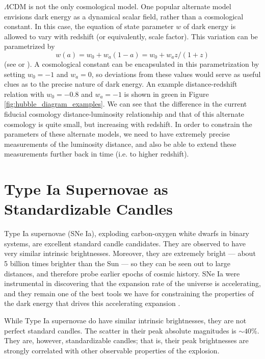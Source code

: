 $\Lambda$CDM is not the only cosmological model. One popular alternate model envisions dark energy as a dynamical scalar field, rather than a cosmological constant. In this case, the equation of state parameter $w$ of dark energy is allowed to vary with redshift (or equivalently, scale factor). This variation can be parametrized by
\begin{equation}
    w(a) = w_0 + w_a(1 - a) = w_0 + w_a z/(1+z)
\end{equation}
(see \citet{chevallier_accelerating_2001} or \citet{linder_exploring_2003}). A cosmological constant can be encapsulated in this parametrization by setting $w_0=-1$ and $w_a=0$, so deviations from these values would serve as useful clues as to the precise nature of dark energy. An example distance-redshift relation with $w_0=-0.8$ and $w_a=-1$ is shown in green in Figure \ref{fig:hubble_diagram_examples}. We can see that the difference in the current fiducial cosmology distance-luminosity relationship and that of this alternate cosmology is quite small, but increasing with redshift. In order to constrain the parameters of these alternate models, we need to have extremely precise measurements of the luminosity distance, and also be able to extend these measurements further back in time (i.e. to higher redshift).

\section{Type Ia Supernovae as Standardizable Candles}
\label{sec:standardizable_candles}
Type Ia supernovae (SNe Ia), exploding carbon-oxygen white dwarfs in binary systems, are excellent standard candle candidates. They are observed to have very similar intrinsic brightnesses. Moreover, they are extremely bright — about 5 billion times brighter than the Sun — so they can be seen out to large distances, and therefore probe earlier epochs of cosmic history. SNe Ia were instrumental in discovering that the expansion rate of the universe is accelerating, and they remain one of the best tools we have for constraining the properties of the dark energy that drives this accelerating expansion \citep{perlmutter_measurements_1999, riess_observational_1998}.

While Type Ia supernovae do have similar intrinsic brightnesses, they are not perfect standard candles. The scatter in their peak absolute magnitudes is $\sim 40$\%. They are, however, standardizable candles; that is, their peak brightnesses are strongly correlated with other observable properties of the explosion.

